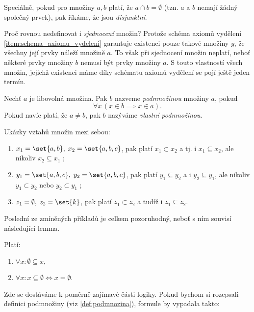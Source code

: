 \begin{remark}
    Speciálně, pokud pro množiny $a,b$ platí, že $a\cap b=\emptyset$ (tzn. $a$ a $b$ nemají žádný společný prvek), pak říkáme, že jsou \emph{disjunktní}.
\end{remark}
Proč rovnou nedefinovat i \emph{sjednocení} množin? Protože schéma axiomů vydělení \ref{item:schema_axiomu_vydeleni} garantuje existenci pouze takové množiny $y$, že všechny její prvky náleží množině $a$. To však při sjednocení množin neplatí, neboť některé prvky množiny $b$ nemusí být prvky množiny $a$. S touto vlastností všech množin, jejichž existenci máme díky schématu axiomů vydělení se pojí ještě jeden termín.
\begin{definition}\label{def:podmnozina}
    Nechť $a$ je libovolná množina. Pak $b$ nazveme \emph{podmnožinou} množiny $a$, pokud
    \begin{equation*}
        \forall x\,(x\in b \implies x\in a).
    \end{equation*}
    Pokud navíc platí, že $a\neq b$, pak $b$ nazýváme \emph{vlastní podmnožinou}.
\end{definition}
\begin{example}
    Ukázky vztahů množin mezi sebou:
    \begin{enumerate}[label=(\roman*)]
        \item $x_1=\set{a,b},\; x_2=\set{a,b,c}$, pak platí $x_1 \subset x_2$ a tj. i $x_1 \subseteq x_2$, ale nikoliv $x_2 \subseteq x_1$ ;
        \item $y_1=\set{a,b,c},\; y_2=\set{a,b,c}$, pak platí $y_1 \subseteq y_2$ a i $y_2 \subseteq y_1$, ale nikoliv $y_1 \subset y_2$ nebo $y_2 \subset y_1$ ;
        \item $z_1=\emptyset,\; z_2=\set{k}$, pak platí $z_1 \subset z_2$ a tudíž i $z_1 \subseteq z_2$.
    \end{enumerate}
\end{example}
Poslední ze zmíněných příkladů je celkem pozoruhodný, neboť s ním souvisí následující lemma.
\begin{lemma}
    Platí:
    \begin{enumerate}[label=(\roman*)]
        \item $\forall x: \emptyset\subseteq x$,
        \item $\forall x: x\subseteq\emptyset\iff x=\emptyset$.
    \end{enumerate}
\end{lemma}
Zde se dostáváme k poměrně zajímavé části logiky. Pokud bychom si rozepsali definici podmnožiny (viz \ref{def:podmnozina}), formule by vypadala takto:
